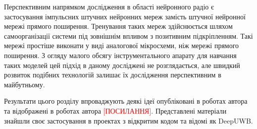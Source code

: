 Перспективним напрямком дослідження в області нейронного радіо є 
застосування імпульсних штучних нейронних мереж замість штучної нейронної 
мережі прямого поширення. Тренування таких мереж здійснюється шляхом 
самоорганізації системи під зовнішнім впливом з позитивним підкріпленням. 
Такі мережі простіше виконати у виді аналогової мікросхеми, ніж мережі
прямого поширення. З огляду малого обсягу інструментального 
апарату для навчання таких моделей цей підхід в даному досліджені не 
розглядається, але швидкий розвиток подібних технологій залишає їх 
дослідження перспективним в майбутньому.

Результати цього розділу впроваджують деякі ідеї опубліковані в роботах 
автора \cite{my:Telecom2018, my:UKRCON2019} та відображені в роботах автора
\textcolor{red}{[ПОСИЛАННЯ]}. Представлені матеріали знайшли своє застосування
в проектах з відкритим кодом та відомі як DeepUWB.

